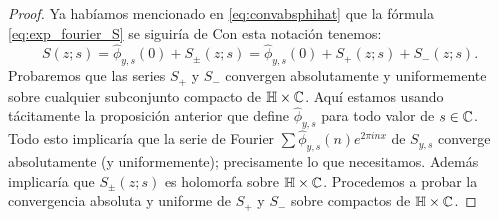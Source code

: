 \begin{proof}
  Ya hab\'iamos mencionado en \eqref{eq:convabsphihat} que la f\'ormula \eqref{eq:exp_fourier_S}
  se siguir\'ia de 
  Con esta notaci\'on tenemos:
  \[
    S(z;s)=\hat{\phi}_{y,s}(0)+S_{\pm}(z;s)=\hat{\phi}_{y,s}(0)+S_+(z;s)+S_-(z;s).
  \]
  Probaremos que las series $S_+$ y $S_-$ convergen  absolutamente y uniformemente sobre
  cualquier subconjunto compacto de $\mathbb{H}\times\mathbb{C}$. Aqu\'i estamos usando t\'acitamente la
  proposici\'on anterior que define $\hat{\phi}_{y,s}$ para todo valor de $s\in\mathbb{C}$.
  Todo esto implicar\'ia que la serie de Fourier $\sum\hat{\phi}_{y,s}(n)e^{2\pi inx}$ de
  $S_{y,s}$ converge absolutamente (y uniformemente); precisamente lo que necesitamos.
  Adem\'as implicar\'ia que $S_{\pm}(z;s)$ es holomorfa sobre $\mathbb{H}\times\mathbb{C}$. Procedemos
  a probar la convergencia absoluta y uniforme de $S_+$ y $S_-$ sobre compactos de
  $\mathbb{H}\times\mathbb{C}$.
  

\end{proof}
